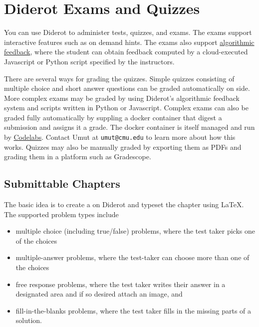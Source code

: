 \chapter{Diderot Exams and Quizzes}
\label{ch:quiz}
 
\begin{preamble}
You can use Diderot to administer tests, quizzes, and exams.
%
The exams support interactive features such as on demand hints.
%
The exams also support \href{}{algorithmic feedback}, where the
student can obtain feedback computed by a cloud-executed Javascript or
Python script specified by the instructors.

There are several ways for grading the quizzes.
%
Simple quizzes consisting of multiple choice and short answer
questions can be graded automatically on side.
%
More complex exams may be graded by using Diderot's algorithmic
feedback system and scripts written in Python or Javascript.
%
Complex exams can also be graded fully automatically by suppling a
docker container that digest a submission and assigns it a grade.
%
The docker container is itself managed and  run by
\href{ch:codelabs}{Codelabs}.
%
Contact Umut at \lstinline`umut@cmu.edu` to learn more about how this works.
%
Quizzes may also be manually graded by exporting them as PDFs and
grading them in a platform such as Gradescope.
%
\end{preamble}


\section{Submittable Chapters}
\label{ch:quiz::submittable-chapters}

The basic idea is to create a  on Diderot and typeset the chapter using LaTeX.  The supported problem types include
\begin{itemize}
\item multiple choice (including true/false) problems, where the test taker picks one of the
  choices
\item multiple-answer problems, where the test-taker can choose more than one of the choices
\item free response problems, where the test taker writes their answer in a designated area and if so desired attach an image, and
\item fill-in-the-blanks problems, where the test taker fills in the missing parts of a solution.
\end{itemize}

